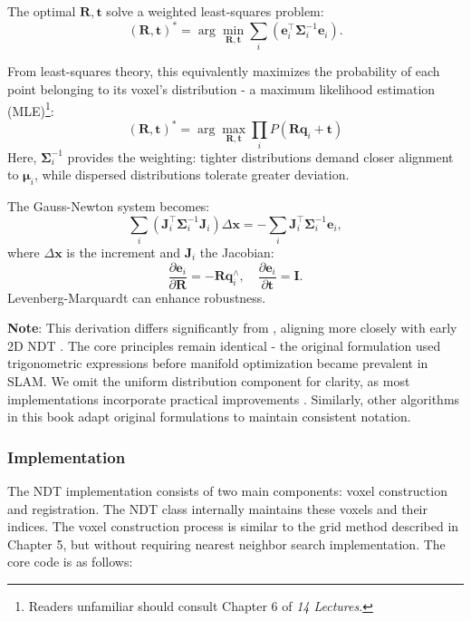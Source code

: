 The optimal $\mathbf{R}, \mathbf{t}$ solve a weighted least-squares problem:
\begin{equation}\label{key}
	(\mathbf{R},\mathbf{t})^* = \arg \min\limits_{\mathbf{R}, \mathbf{t}} \sum_{i} (\mathbf{e}_i^\top \boldsymbol{\Sigma}_i^{-1} \mathbf{e}_i) .
\end{equation}

From least-squares theory, this equivalently maximizes the probability of each point belonging to its voxel's distribution - a maximum likelihood estimation (MLE)\footnote{Readers unfamiliar should consult Chapter 6 of \textit{14 Lectures}.}:
\begin{equation}\label{key}
	(\mathbf{R},\mathbf{t})^* = \arg \max\limits_{\mathbf{R}, \mathbf{t}} \prod_{i} P(\mathbf{R} \mathbf{q}_i + \mathbf{t})
\end{equation}
Here, $\boldsymbol{\Sigma}^{-1}_i$ provides the weighting: tighter distributions demand closer alignment to $\boldsymbol{\mu}_i$, while dispersed distributions tolerate greater deviation.

The Gauss-Newton system becomes:
\begin{equation}\label{eq:ndt-normal-equation}
	\sum_{i} (\mathbf{J}_i^\top \boldsymbol{\Sigma}_i^{-1} \mathbf{J}_i) \Delta \mathbf{x} = -\sum_{i} \mathbf{J}_i^\top \boldsymbol{\Sigma}^{-1}_i \mathbf{e}_i,
\end{equation}
where $\Delta \mathbf{x}$ is the increment and $\mathbf{J}_i$ the Jacobian:
\begin{equation}\label{key}
	\frac{\partial \mathbf{e}_i}{\partial \mathbf{R}} = -\mathbf{R} \mathbf{q}_i^\wedge, \quad \frac{\partial \mathbf{e}_i}{\partial \mathbf{t}} = \mathbf{I}.
\end{equation}
Levenberg-Marquardt can enhance robustness.

\textbf{Note}: This derivation differs significantly from \cite{Magnusson2009}, aligning more closely with early 2D NDT \cite{Biber2003}. The core principles remain identical - the original formulation used trigonometric expressions before manifold optimization became prevalent in SLAM. We omit the uniform distribution component for clarity, as most implementations incorporate practical improvements \cite{Kung2021, Rapp2015}. Similarly, other algorithms in this book adapt original formulations to maintain consistent notation.

\subsubsection{Implementation}
The NDT implementation consists of two main components: voxel construction and registration. The NDT class internally maintains these voxels and their indices. The voxel construction process is similar to the grid method described in Chapter 5, but without requiring nearest neighbor search implementation. The core code is as follows:

